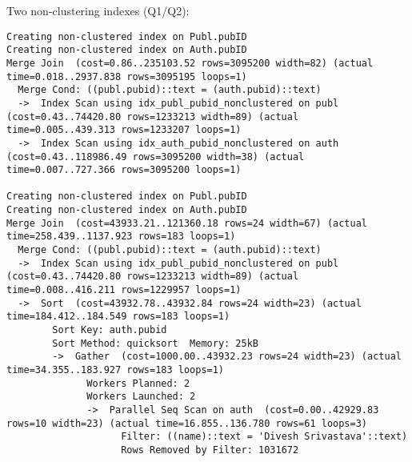\documentclass[11pt]{scrartcl}
\begin{document}
Two non-clustering indexes (Q1/Q2):
{\small
\parskip0pt\begin{verbatim}
Creating non-clustered index on Publ.pubID
Creating non-clustered index on Auth.pubID
Merge Join  (cost=0.86..235103.52 rows=3095200 width=82) (actual time=0.018..2937.838 rows=3095195 loops=1)
  Merge Cond: ((publ.pubid)::text = (auth.pubid)::text)
  ->  Index Scan using idx_publ_pubid_nonclustered on publ  (cost=0.43..74420.80 rows=1233213 width=89) (actual time=0.005..439.313 rows=1233207 loops=1)
  ->  Index Scan using idx_auth_pubid_nonclustered on auth  (cost=0.43..118986.49 rows=3095200 width=38) (actual time=0.007..727.366 rows=3095200 loops=1)

Creating non-clustered index on Publ.pubID
Creating non-clustered index on Auth.pubID
Merge Join  (cost=43933.21..121360.18 rows=24 width=67) (actual time=258.439..1137.923 rows=183 loops=1)
  Merge Cond: ((publ.pubid)::text = (auth.pubid)::text)
  ->  Index Scan using idx_publ_pubid_nonclustered on publ  (cost=0.43..74420.80 rows=1233213 width=89) (actual time=0.008..416.211 rows=1229957 loops=1)
  ->  Sort  (cost=43932.78..43932.84 rows=24 width=23) (actual time=184.412..184.549 rows=183 loops=1)
        Sort Key: auth.pubid
        Sort Method: quicksort  Memory: 25kB
        ->  Gather  (cost=1000.00..43932.23 rows=24 width=23) (actual time=34.355..183.927 rows=183 loops=1)
              Workers Planned: 2
              Workers Launched: 2
              ->  Parallel Seq Scan on auth  (cost=0.00..42929.83 rows=10 width=23) (actual time=16.855..136.780 rows=61 loops=3)
                    Filter: ((name)::text = 'Divesh Srivastava'::text)
                    Rows Removed by Filter: 1031672
\end{verbatim}}
\end{document}
